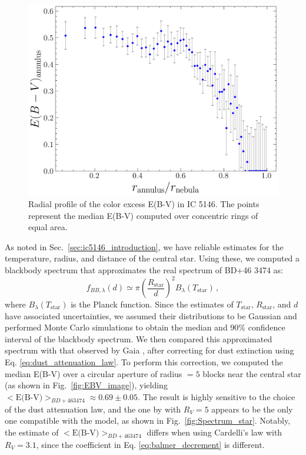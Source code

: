 \documentclass[fleqn,usenatbib]{mnras}
\begin{document}
\begin{figure}\centering
	\includegraphics[width=0.7\columnwidth]{EBV_profile.png}
    \caption{Radial profile of the color excess E(B-V) in IC 5146. The points represent the median E(B-V) computed over concentric rings of equal area.}
    \label{fig:EBV_profile}
\end{figure}

As noted in Sec.~\ref{sec:ic5146_introduction}, we have reliable estimates for the temperature, radius, and distance of the central star.
Using these, we computed a blackbody spectrum that approximates the real spectrum of BD+46 3474 as:
\begin{equation}
  f_{BB, \lambda} (d) \simeq \pi \left(\frac{R_\text{star}}{d}\right)^2 B_\lambda (T_\text{star}) \, ,
  \label{eq:blackbody_spectrum}
\end{equation}
where $B_\lambda (T_\text{star})$ is the Planck function.
Since the estimates of $T_\text{star}$, $R_\text{star}$, and $d$ have associated uncertainties, we assumed their distributions to be Gaussian and performed Monte Carlo simulations to obtain the median and $90\%$ confidence interval of the blackbody spectrum.
We then compared this approximated spectrum with that observed by Gaia \citep{Gaia_2023}, after correcting for dust extinction using Eq. \ref{eq:dust_attenuation_law}.
To perform this correction, we computed the median E(B-V) over a circular aperture of radius $= 5$ blocks near the central star (as shown in Fig.~\ref{fig:EBV_image}), yielding $<\text{E(B-V)}>_{BD+46 3474} \approx 0.69 \pm 0.05$.
The result is highly sensitive to the choice of the dust attenuation law, and the one by \cite{Cardelli_1989} with $R_V = 5$ appears to be the only one compatible with the model, as shown in Fig.~\ref{fig:Spectrum_star}.
Notably, the estimate of $<\text{E(B-V)}>_{BD+46 3474}$ differs when using Cardelli's law with $R_V = 3.1$, since the coefficient in Eq. \ref{eq:balmer_decrement} is different.
\end{document}

